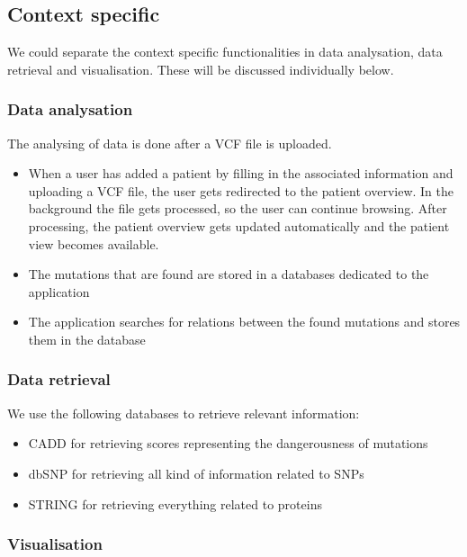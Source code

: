 \subsection{Context specific}

We could separate the context specific functionalities in data analysation, data retrieval and visualisation. These will be discussed individually below.

\subsubsection{Data analysation}

The analysing of data is done after a VCF file is uploaded.

\begin{itemize}
  \item When a user has added a patient by filling in the associated information and uploading a VCF file, the user gets redirected to the patient overview. In the background the file gets processed, so the user can continue browsing. After processing, the patient overview gets updated automatically and the patient view becomes available.
  \item The mutations that are found are stored in a databases dedicated to the application
  \item The application searches for relations between the found mutations and stores them in the database
\end{itemize}

\subsubsection{Data retrieval}

We use the following databases to retrieve relevant information:

\begin{itemize}
  \item CADD for retrieving scores representing the dangerousness of mutations
  \item dbSNP for retrieving all kind of information related to SNPs
  \item STRING for retrieving everything related to proteins
\end{itemize}

\subsubsection{Visualisation}

